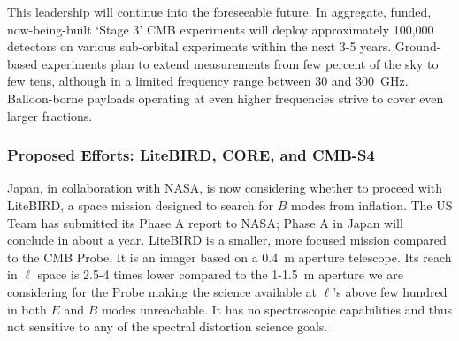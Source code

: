 This leadership will continue into the foreseeable future. In aggregate, funded, now-being-built 
`Stage 3' CMB experiments will deploy approximately 100,000 detectors on various sub-orbital 
experiments within the next 3-5 years. 
Ground-based experiments plan to extend measurements from few percent of the sky to 
few tens, although in a limited frequency range between 30 and 300~GHz. Balloon-borne 
payloads operating at even higher frequencies strive to cover even larger fractions.  



\vspace{-0.18in}

\subsubsection{Proposed Efforts: LiteBIRD, CORE, and CMB-S4} 

\vspace{-0.05in}

Japan, in collaboration with NASA, is now considering whether to proceed with LiteBIRD, a space mission 
designed to search for $B$ modes from inflation. The US Team has submitted its Phase A report to NASA; Phase A 
in Japan will conclude in about a year. LiteBIRD is a smaller, more focused
mission compared to the CMB Probe. It is an imager based on a 0.4~m aperture 
telescope. Its reach in $\ell$ space is 2.5-4 times lower compared to the 1-1.5~m aperture 
we are considering for the Probe making the science available at $\ell$'s above 
few hundred in both $E$ and $B$ modes unreachable. 
It has no spectroscopic capabilities and thus not sensitive to any of the spectral distortion science goals. 


